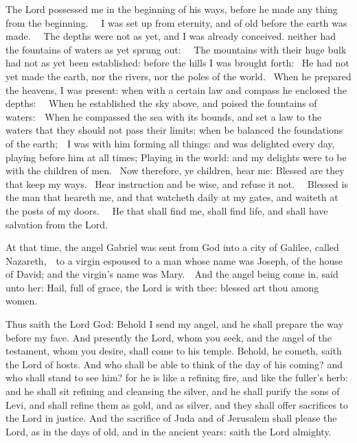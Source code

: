 



The Lord possessed me in the beginning of his ways, before he made any thing
from the beginning.   I was set up from eternity, and of old before the earth
was made.   The depths were not as yet, and I was already conceived. neither
had the fountains of waters as yet sprung out:   The mountains with their huge
bulk had not as yet been established: before the hills I was brought forth:  He
had not yet made the earth, nor the rivers, nor the poles of the world.  When
he prepared the heavens, I was present: when with a certain law and compass he
enclosed the depths:   When he established the sky above, and poised the
fountains of waters:  When he compassed the sea with its bounds, and set a law
to the waters that they should not pass their limits: when be balanced the
foundations of the earth;  I was with him forming all things: and was delighted
every day, playing before him at all times; Playing in the world: and my
delights were to be with the children of men.  Now therefore, ye children, hear
me: Blessed are they that keep my ways.  Hear instruction and be wise, and
refuse it not.   Blessed is the man that heareth me, and that watcheth daily at
my gates, and waiteth at the posts of my doors.   He that shall find me, shall
find life, and shall have salvation from the Lord.



At that time, the angel Gabriel was sent from God into a city of
Galilee, called Nazareth,  to a virgin espoused to a man whose name was Joseph,
of the house of David; and the virgin's name was Mary.  And the angel being
come in, said unto her: Hail, full of grace, the Lord is with thee: blessed art
thou among women. 



\bigskip




Thus saith the Lord God:
Behold I send my angel, and he shall prepare the way before my
face. And presently the Lord, whom you seek, and the angel of the
testament, whom you desire, shall come to his temple. Behold, he cometh,
saith the Lord of hosts.
And who shall be able to think of the day of his coming? and who
shall stand to see him? for he is like a refining fire, and like the
fuller's herb:
and he shall sit refining and cleansing the silver, and he shall
purify the sons of Levi, and shall refine them as gold, and as silver,
and they shall offer sacrifices to the Lord in justice.
And the sacrifice of Juda and of Jerusalem shall please the Lord,
as in the days of old, and in the ancient years:
saith the Lord almighty.


